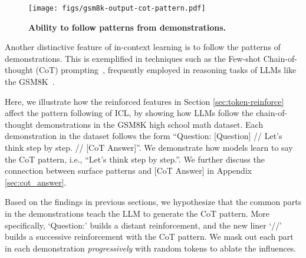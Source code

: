 \documentclass{article} %
\def\elliott#1{{\color{cyan}{\bf [Elliott:} {{#1}}{\bf ]}}}
\begin{document}

\begin{wrapfigure}{l}{0.4\textwidth}
  \centering
  \texttt{[image: figs/gsm8k-output-cot-pattern.pdf]}
  \caption{\textbf{Ability to follow patterns from demonstrations.}}
  \label{fig:gsm8k}
  \vspace{-15pt}
\end{wrapfigure}

Another distinctive feature of in-context learning is to follow the patterns of demonstrations.
This is exemplified in techniques such as the Few-shot Chain-of-thought (CoT) prompting~\citep{wei2022chain}, frequently employed in reasoning tasks of LLMs like the GSM8K~\citep{cobbe2021training}.

Here, we illustrate how the reinforced features in Section \ref{sec:token-reinforce} affect the pattern following of ICL, by showing how LLMs follow the chain-of-thought demonstrations in the GSM8K high school math dataset.
Each demonstration in the dataset follows the form ``Question: [Question] // Let's think step by step. // [CoT Answer]''. 
We demonstrate how models learn to say the CoT pattern, i.e., ``Let's think step by step.''. We further discuss the connection between surface patterns and [CoT Answer] in Appendix \ref{sec:cot_answer}.


Based on the findings in previous sections, we hypothesize that the common parts in the demonstrations teach the LLM to generate the CoT pattern. More specifically, `Question:' builds a distant reinforcement, and the new liner `//' builds a successive reinforcement with the CoT pattern. 
We mask out each part in each demonstration \emph{progressively} with random tokens to ablate the influences. 
\end{document}
